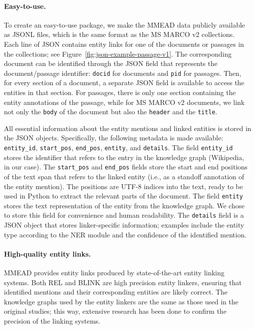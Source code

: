 \paragraph{Easy-to-use.} To create an easy-to-use package, we make the MMEAD data publicly available as JSONL files, which is the same format as the MS MARCO v2 collections. Each line of JSON contains entity links for one of the documents or passages in the collections; see Figure~\ref{fig:json-example-passage-v1}. The corresponding document can be identified through the JSON field that represents the document/passage identifier: \texttt{docid} for documents and \texttt{pid} for passages. Then, for every section of a document, a separate JSON field is available to access the entities in that section. For passages, there is only one section containing the entity annotations of the passage, while for MS MARCO v2 documents, we link not only the \texttt{body} of the document but also the \texttt{header} and the \texttt{title}.

All essential information about the entity mentions and linked entities is stored in the JSON objects. 
Specifically, the following metadata is made available: \texttt{entity\_id}, \texttt{start\_pos}, \texttt{end\_pos}, \texttt{entity}, and \texttt{details}. The field \texttt{entity\_id} stores the identifier that refers to the entry in the knowledge graph (Wikipedia, in our case). The \texttt{start\_pos} and \texttt{end\_pos} fields store the start and end positions of the text span that refers to the linked entity (i.e., as a standoff annotation of the entity mention). The positions are UTF-8 indices into the text, ready to be used in Python to extract the relevant parts of the document. The field \texttt{entity} stores the text representation of the entity from the knowledge graph. 
We chose to store this field for convenience and human readability. The \texttt{details} field is a JSON object that stores linker-specific information; examples include the entity type according to the NER module and the confidence of the identified mention.

\paragraph{High-quality entity links.} MMEAD provides entity links produced by state-of-the-art entity linking systems. Both REL and BLINK are high precision entity linkers, ensuring that identified mentions and their corresponding entities are likely correct. The knowledge graphs used by the entity linkers are the same as those used in the original studies; this way, extensive research has been done to confirm the precision of the linking systems.

